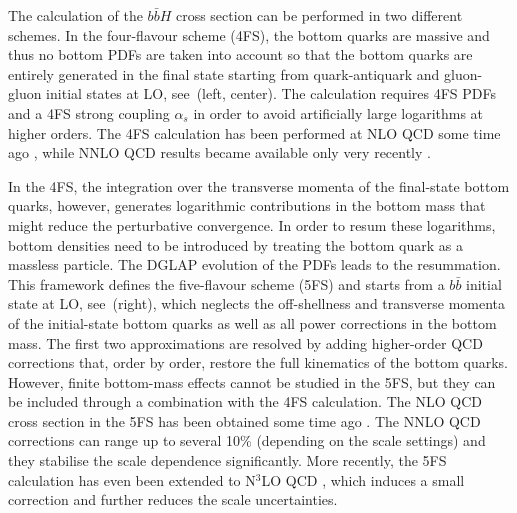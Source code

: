 \documentclass[11pt,a4paper]{article}
\begin{document}
The calculation of the $b\bar bH$ cross section can be performed in two different schemes. In the four-flavour scheme (4FS), the bottom quarks are massive and thus no bottom PDFs are taken into account so that the bottom quarks are entirely generated in the final state starting from quark-antiquark and gluon-gluon initial states at LO, see \,(left, center). The calculation requires 4FS PDFs and a 4FS strong coupling $\alpha_s$ in order to avoid artificially large logarithms at higher orders. The 4FS calculation has been performed at NLO QCD some time ago \cite{dittmaier:2003ej,dawson:2003kb}, while NNLO QCD results became available only very recently \cite{Biello:2024pgo}.

In the 4FS, the integration over the transverse momenta of the final-state bottom quarks, however, generates logarithmic contributions in the 
bottom mass that might reduce the perturbative convergence. In order to resum these logarithms, bottom densities need to be introduced by
treating the bottom quark as a massless particle. The DGLAP evolution of the PDFs leads to the resummation. This framework defines the five-flavour scheme (5FS) and starts from a $b\bar b$ initial state at LO, see \,(right), which neglects the off-shellness and transverse momenta of the initial-state bottom quarks
as well as all power corrections in the bottom mass. The first two approximations are resolved by adding higher-order QCD corrections that, order by order, restore the full kinematics of the bottom quarks. However, finite bottom-mass effects cannot be studied in the 5FS, but they can be included
through a combination with the 4FS calculation. The NLO QCD cross section in the 5FS has been obtained some time 
ago \cite{dicus:1998hs,balazs:1998bm}. The NNLO QCD corrections \cite{harlander_2003} can range up to several 10\% (depending on the scale settings)
and they stabilise the scale dependence significantly. More recently, the 5FS calculation has even been extended to N$^3$LO QCD \cite{duhr:2019kwi}, which 
induces a small correction and further reduces the scale uncertainties.
\end{document}
